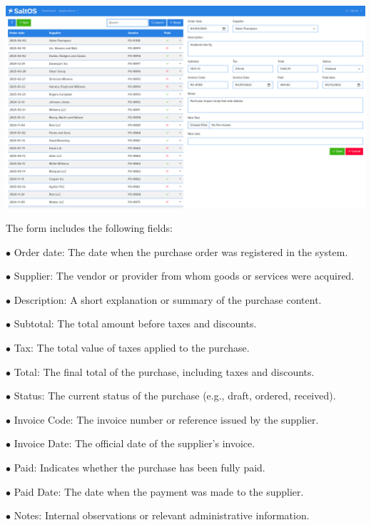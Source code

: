 \documentclass[a4paper]{article}
\begin{document}
\begin{center}\includegraphics[width=1\textwidth]{../ujest/snaps/test-screenshots-js-screenshots-purchases-purchase-edit-100-en-us-1-snap.png}\end{center}

The form includes the following fields:

\begin{compactitem}
\item[\color{myblue}$\bullet$] Order date: The date when the purchase order was registered in the system.
\item[\color{myblue}$\bullet$] Supplier: The vendor or provider from whom goods or services were acquired.
\item[\color{myblue}$\bullet$] Description: A short explanation or summary of the purchase content.
\item[\color{myblue}$\bullet$] Subtotal: The total amount before taxes and discounts.
\item[\color{myblue}$\bullet$] Tax: The total value of taxes applied to the purchase.
\item[\color{myblue}$\bullet$] Total: The final total of the purchase, including taxes and discounts.
\item[\color{myblue}$\bullet$] Status: The current status of the purchase (e.g., draft, ordered, received).
\item[\color{myblue}$\bullet$] Invoice Code: The invoice number or reference issued by the supplier.
\item[\color{myblue}$\bullet$] Invoice Date: The official date of the supplier’s invoice.
\item[\color{myblue}$\bullet$] Paid: Indicates whether the purchase has been fully paid.
\item[\color{myblue}$\bullet$] Paid Date: The date when the payment was made to the supplier.
\item[\color{myblue}$\bullet$] Notes: Internal observations or relevant administrative information.
\end{compactitem}
\end{document}
